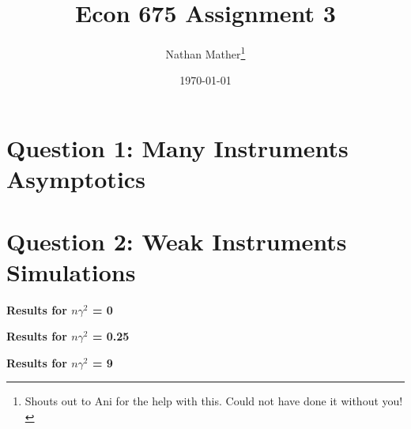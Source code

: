 \documentclass[11pt]{article}
\title{Econ 675 Assignment 3} %
\author{Nathan Mather\thanks{Shouts out to Ani  for the help with this. Could not have done it without you! } } %
\date{\today} %
\begin{document}
	
\maketitle %

\setcounter{tocdepth}{2} %

\tableofcontents %



\section{Question 1: Many Instruments Asymptotics}





\section{Question 2: Weak Instruments Simulations}

\begin{center}
	
	\centering
	
	\textbf{Results for $n \gamma^2$ = 0}\par\medskip
	\scalebox{1}{
		
	}
\end{center}

\begin{center}
	
	\centering
	
	\textbf{Results for $n \gamma^2$ = 0.25}\par\medskip
	\scalebox{1}{
		
	}
\end{center}

\begin{center}
	
	\centering
	
	\textbf{Results for $n \gamma^2$ = 9}\par\medskip
	\scalebox{1}{
		
	}
\end{center}
\end{document}
